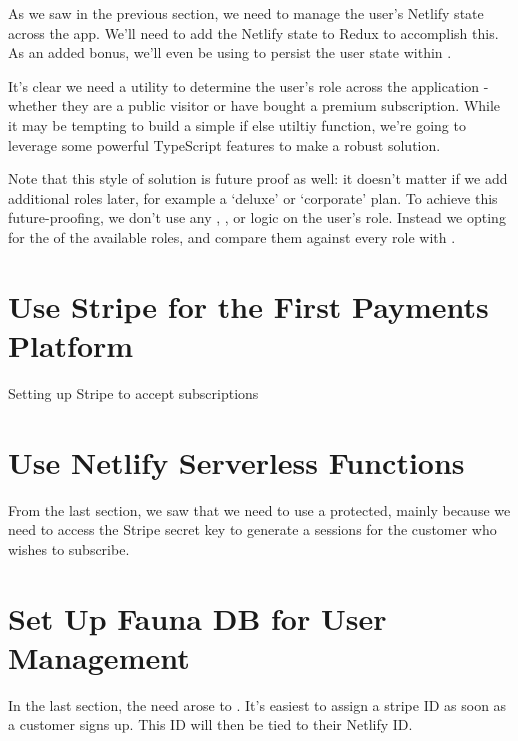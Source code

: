 \documentclass[a4paper,headinclude=on,footinclude=on,12pt,oneside]{scrbook}
\begin{document}
As we saw in the previous section, we need to manage the user's Netlify state across the app. We'll need to add the Netlify state to Redux to accomplish this. As an added bonus, we'll even be using  to persist the user state within .


It's clear we need a utility to determine the user's role across the application - whether they are a public visitor or have bought a premium subscription. While it may be tempting to build a simple if else utiltiy function, we're going to leverage some powerful TypeScript features to make a robust solution.

Note that this style of solution is future proof as well: it doesn't matter if we add additional roles later, for example a `deluxe' or `corporate' plan. To achieve this future-proofing, we don't use any , , or  logic on the user's role. Instead we opting for the  of the available roles, and compare them against every role with .

\section{Use Stripe for the First Payments Platform}
\begin{arrows}
\item Setting up Stripe to accept subscriptions
\end{arrows}

\section{Use Netlify Serverless Functions}

From the last section, we saw that we need to use a protected, mainly because we need to access the Stripe secret key to generate a sessions for the customer who wishes to subscribe.

\section{Set Up Fauna DB for User Management}

In the last section, the need arose to . It's easiest to assign a stripe ID as soon as a customer signs up. This ID will then be tied to their Netlify ID.
\end{document}
